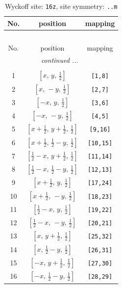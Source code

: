 \documentclass[fleqn,8pt]{jsarticle}
\begin{document}
\renewcommand{\arraystretch}{1.2}
\begin{longtable}{ccc}
\caption{Wyckoff site: {\tt 16z}, site symmetry: {\tt ..m}}
 \\
 \hline \hline
No. & position & mapping \\ \hline \endfirsthead

\multicolumn{2}{l}{\tablename\ \thetable{}} \\
 \hline \hline
No. & position & mapping \\ \hline \endhead

 \hline \hline
\multicolumn{2}{r}{\footnotesize\it continued ...} \\ \endfoot

 \hline \hline
\multicolumn{2}{r}{} \\ \endlastfoot

1 & $\left[ x,\, y,\, \frac{1}{2} \right]$ & {\tt [1,8]} \\ \hline
2 & $\left[ x,\, - y,\, \frac{1}{2} \right]$ & {\tt [2,7]} \\ \hline
3 & $\left[ - x,\, y,\, \frac{1}{2} \right]$ & {\tt [3,6]} \\ \hline
4 & $\left[ - x,\, - y,\, \frac{1}{2} \right]$ & {\tt [4,5]} \\ \hline
5 & $\left[ x + \frac{1}{2},\, y + \frac{1}{2},\, \frac{1}{2} \right]$ & {\tt [9,16]} \\ \hline
6 & $\left[ x + \frac{1}{2},\, \frac{1}{2} - y,\, \frac{1}{2} \right]$ & {\tt [10,15]} \\ \hline
7 & $\left[ \frac{1}{2} - x,\, y + \frac{1}{2},\, \frac{1}{2} \right]$ & {\tt [11,14]} \\ \hline
8 & $\left[ \frac{1}{2} - x,\, \frac{1}{2} - y,\, \frac{1}{2} \right]$ & {\tt [12,13]} \\ \hline
9 & $\left[ x + \frac{1}{2},\, y,\, \frac{1}{2} \right]$ & {\tt [17,24]} \\ \hline
10 & $\left[ x + \frac{1}{2},\, - y,\, \frac{1}{2} \right]$ & {\tt [18,23]} \\ \hline
11 & $\left[ \frac{1}{2} - x,\, y,\, \frac{1}{2} \right]$ & {\tt [19,22]} \\ \hline
12 & $\left[ \frac{1}{2} - x,\, - y,\, \frac{1}{2} \right]$ & {\tt [20,21]} \\ \hline
13 & $\left[ x,\, y + \frac{1}{2},\, \frac{1}{2} \right]$ & {\tt [25,32]} \\ \hline
14 & $\left[ x,\, \frac{1}{2} - y,\, \frac{1}{2} \right]$ & {\tt [26,31]} \\ \hline
15 & $\left[ - x,\, y + \frac{1}{2},\, \frac{1}{2} \right]$ & {\tt [27,30]} \\ \hline
16 & $\left[ - x,\, \frac{1}{2} - y,\, \frac{1}{2} \right]$ & {\tt [28,29]} \\
\end{longtable}
\end{document}
